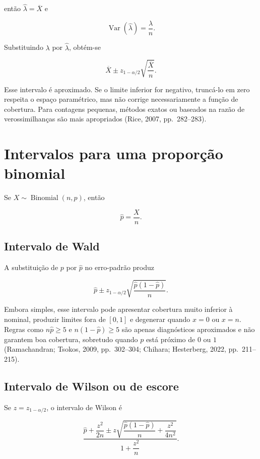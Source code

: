 \documentclass[
  letterpaper,
  DIV=11,
  numbers=noendperiod]{scrreprt}
\begin{document}
então \(\widehat\lambda=\overline X\) e

\[\operatorname{Var}(\widehat\lambda)=\frac{\lambda}{n}.\]

Substituindo \(\lambda\) por \(\widehat\lambda\), obtém-se

\[\boxed{
\overline X\pm z_{1-\alpha/2}\sqrt{\frac{\overline X}{n}}
}.\]

Esse intervalo é aproximado. Se o limite inferior for negativo,
truncá-lo em zero respeita o espaço paramétrico, mas não corrige
necessariamente a função de cobertura. Para contagens pequenas, métodos
exatos ou baseados na razão de verossimilhanças são mais apropriados
(Rice, 2007, pp.~282--283).

\section{Intervalos para uma proporção
binomial}\label{intervalos-para-uma-proporuxe7uxe3o-binomial}

Se \(X\sim\operatorname{Binomial}(n,p)\), então

\[\widehat p=\frac{X}{n}.\]

\subsection{Intervalo de Wald}\label{intervalo-de-wald-1}

A substituição de \(p\) por \(\widehat p\) no erro-padrão produz

\[\boxed{
\widehat p\pm z_{1-\alpha/2}
\sqrt{\frac{\widehat p(1-\widehat p)}{n}}
}.\]

Embora simples, esse intervalo pode apresentar cobertura muito inferior
à nominal, produzir limites fora de \([0,1]\) e degenerar quando \(x=0\)
ou \(x=n\). Regras como \(n\widehat p\geq5\) e \(n(1-\widehat p)\geq5\)
são apenas diagnósticos aproximados e não garantem boa cobertura,
sobretudo quando \(p\) está próximo de \(0\) ou \(1\) (Ramachandran;
Tsokos, 2009, pp.~302--304; Chihara; Hesterberg, 2022, pp.~211--215).

\subsection{Intervalo de Wilson ou de
escore}\label{intervalo-de-wilson-ou-de-escore}

Se \(z=z_{1-\alpha/2}\), o intervalo de Wilson é

\[\boxed{
\frac{
\widehat p+\dfrac{z^2}{2n}
\pm
z\sqrt{
\dfrac{\widehat p(1-\widehat p)}{n}
+\dfrac{z^2}{4n^2}
}
}{1+\dfrac{z^2}{n}}
}.\]
\end{document}
